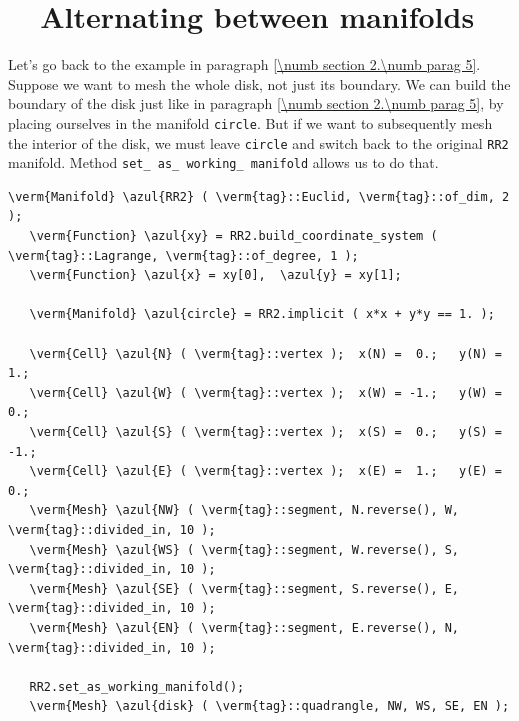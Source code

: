 \section{~~Alternating between manifolds}\label{\numb section 2.\numb parag 9}

Let's go back to the example in paragraph \ref{\numb section 2.\numb parag 5}.
Suppose we want to mesh the whole disk, not just its boundary.
We can build the boundary of the disk just like in paragraph
\ref{\numb section 2.\numb parag 5}, by placing ourselves in the manifold {\small\tt circle}.
But if we want to subsequently mesh the interior of the disk, we must leave {\small\tt circle}
and switch back to the original {\small\tt RR2} manifold.
Method {\small\tt set\_\,as\_\,working\_\,manifold} allows us to do that.

\begin{Verbatim}[commandchars=\\\{\},formatcom=\small\tt,frame=single,
   label=parag-\ref{\numb section 2.\numb parag 9}.cpp,rulecolor=\color{coment},
   baselinestretch=0.94,framesep=2mm]
   \verm{Manifold} \azul{RR2} ( \verm{tag}::Euclid, \verm{tag}::of_dim, 2 );
   \verm{Function} \azul{xy} = RR2.build_coordinate_system ( \verm{tag}::Lagrange, \verm{tag}::of_degree, 1 );
   \verm{Function} \azul{x} = xy[0],  \azul{y} = xy[1];
   
   \verm{Manifold} \azul{circle} = RR2.implicit ( x*x + y*y == 1. );
   
   \verm{Cell} \azul{N} ( \verm{tag}::vertex );  x(N) =  0.;   y(N) =  1.;
   \verm{Cell} \azul{W} ( \verm{tag}::vertex );  x(W) = -1.;   y(W) =  0.;
   \verm{Cell} \azul{S} ( \verm{tag}::vertex );  x(S) =  0.;   y(S) = -1.;
   \verm{Cell} \azul{E} ( \verm{tag}::vertex );  x(E) =  1.;   y(E) =  0.;
   \verm{Mesh} \azul{NW} ( \verm{tag}::segment, N.reverse(), W, \verm{tag}::divided_in, 10 );
   \verm{Mesh} \azul{WS} ( \verm{tag}::segment, W.reverse(), S, \verm{tag}::divided_in, 10 );
   \verm{Mesh} \azul{SE} ( \verm{tag}::segment, S.reverse(), E, \verm{tag}::divided_in, 10 );
   \verm{Mesh} \azul{EN} ( \verm{tag}::segment, E.reverse(), N, \verm{tag}::divided_in, 10 );
   
   RR2.set_as_working_manifold();
   \verm{Mesh} \azul{disk} ( \verm{tag}::quadrangle, NW, WS, SE, EN );
\end{Verbatim}

